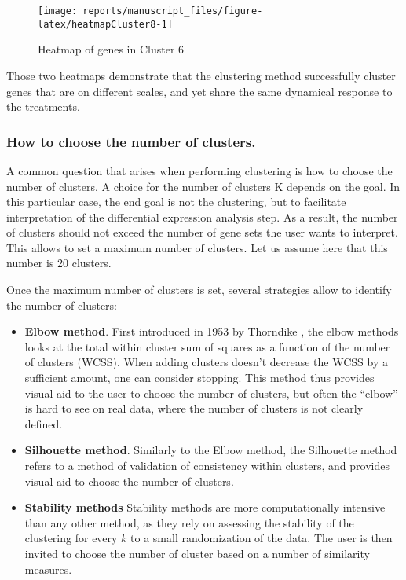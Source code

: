 \documentclass[9pt,a4paper,]{extarticle}
\begin{document}
\begin{figure}[H]

{\centering \texttt{[image: reports/manuscript\_files/figure-latex/heatmapCluster8-1]} 

}

\caption{Heatmap of genes in Cluster 6}\label{fig:heatmapCluster8}
\end{figure}

Those two heatmaps demonstrate that the clustering method successfully cluster
genes that are on different scales, and yet share the same dynamical response
to the treatments.

\hypertarget{how-to-choose-the-number-of-clusters.}{%
\subsubsection{How to choose the number of clusters.}\label{how-to-choose-the-number-of-clusters.}}

A common question that arises when performing clustering is how to choose the
number of clusters. A choice for the number of clusters K depends on the goal.
In this particular case, the end goal is not the clustering, but to facilitate
interpretation of the differential expression analysis step. As a result, the
number of clusters should not exceed the number of gene sets the user wants to
interpret. This allows to set a maximum number of clusters. Let us assume here
that this number is 20 clusters.

Once the maximum number of clusters is set, several strategies allow to
identify the number of clusters:

\begin{itemize}
\tightlist
\item
  \textbf{Elbow method}. First introduced in 1953 by Thorndike \citep{thorndike:who},
  the elbow methods looks at the total within cluster sum of squares
  as a function of the number of clusters (WCSS). When adding clusters
  doesn't decrease the WCSS by a sufficient
  amount, one can consider stopping. This method thus provides visual aid to
  the user to choose the number of clusters, but often the ``elbow'' is hard to
  see on real data, where the number of clusters is not clearly defined.
\item
  \textbf{Silhouette method}. Similarly to the Elbow method, the Silhouette method
  refers to a method of validation of consistency within clusters, and
  provides visual aid to choose the number of clusters.
\item
  \textbf{Stability methods} Stability methods are more computationally intensive
  than any other method, as they rely on assessing the stability of the
  clustering for every \(k\) to a small randomization of the data. The user is
  then invited to choose the number of cluster based on a number of similarity
  measures.
\end{itemize}
\end{document}
